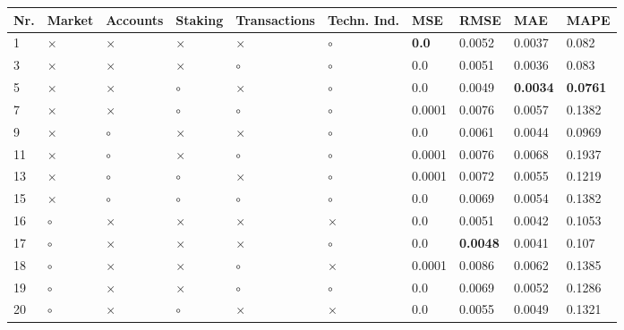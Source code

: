 \begin{table}[H]
\centering
\begin{tabular}{|P{0.7cm}|P{1.3cm}P{1.3cm}P{1.3cm}P{1.3cm}P{1.3cm}|P{1.1cm}P{1.1cm}P{1.1cm}P{1.1cm}|}
\hline
 Nr. &   Market & Accounts &  Staking & Transactions & Techn. Ind. &          MSE &            RMSE &             MAE &            MAPE \\
 & $\times$ & $\times$ & $\times$ &     $\times$ &     $\circ$ & \textbf{0.0} &          0.0052 &          0.0037 &           0.082 \\
   3 & $\times$ & $\times$ & $\times$ &      $\circ$ &     $\circ$ &          0.0 &          0.0051 &          0.0036 &           0.083 \\
   5 & $\times$ & $\times$ &  $\circ$ &     $\times$ &     $\circ$ &          0.0 &          0.0049 & \textbf{0.0034} & \textbf{0.0761} \\
   7 & $\times$ & $\times$ &  $\circ$ &      $\circ$ &     $\circ$ &       0.0001 &          0.0076 &          0.0057 &          0.1382 \\
   9 & $\times$ &  $\circ$ & $\times$ &     $\times$ &     $\circ$ &          0.0 &          0.0061 &          0.0044 &          0.0969 \\
  11 & $\times$ &  $\circ$ & $\times$ &      $\circ$ &     $\circ$ &       0.0001 &          0.0076 &          0.0068 &          0.1937 \\
  13 & $\times$ &  $\circ$ &  $\circ$ &     $\times$ &     $\circ$ &       0.0001 &          0.0072 &          0.0055 &          0.1219 \\
  15 & $\times$ &  $\circ$ &  $\circ$ &      $\circ$ &     $\circ$ &          0.0 &          0.0069 &          0.0054 &          0.1382 \\
  16 &  $\circ$ & $\times$ & $\times$ &     $\times$ &    $\times$ &          0.0 &          0.0051 &          0.0042 &          0.1053 \\
  17 &  $\circ$ & $\times$ & $\times$ &     $\times$ &     $\circ$ &          0.0 & \textbf{0.0048} &          0.0041 &           0.107 \\
  18 &  $\circ$ & $\times$ & $\times$ &      $\circ$ &    $\times$ &       0.0001 &          0.0086 &          0.0062 &          0.1385 \\
  19 &  $\circ$ & $\times$ & $\times$ &      $\circ$ &     $\circ$ &          0.0 &          0.0069 &          0.0052 &          0.1286 \\
  20 &  $\circ$ & $\times$ &  $\circ$ &     $\times$ &    $\times$ &          0.0 &          0.0055 &          0.0049 &          0.1321 \\

\end{tabular}
\end{table}
